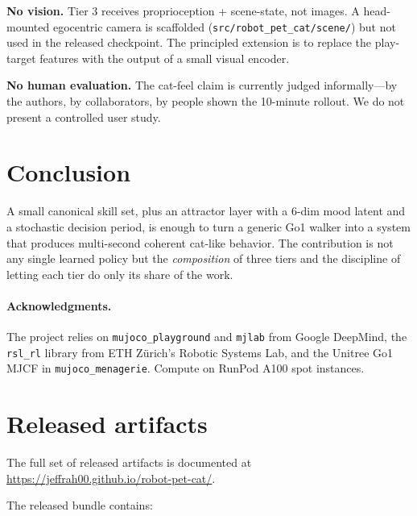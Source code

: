\documentclass[11pt]{article}
\begin{document}
\textbf{No vision.} Tier 3 receives proprioception + scene-state, not
images. A head-mounted egocentric camera is scaffolded
(\texttt{src/robot\_pet\_cat/scene/}) but not used in the released
checkpoint. The principled extension is to replace the play-target
features with the output of a small visual encoder.

\textbf{No human evaluation.} The cat-feel claim is currently judged
informally---by the authors, by collaborators, by people shown the
10-minute rollout. We do not present a controlled user study.

\section{Conclusion}

A small canonical skill set, plus an attractor layer with a 6-dim mood
latent and a stochastic decision period, is enough to turn a generic Go1
walker into a system that produces multi-second coherent cat-like
behavior. The contribution is not any single learned policy but the
\emph{composition} of three tiers and the discipline of letting each tier
do only its share of the work.

\paragraph{Acknowledgments.}
The project relies on \texttt{mujoco\_playground} and \texttt{mjlab} from
Google DeepMind, the \texttt{rsl\_rl} library from ETH Z\"{u}rich's Robotic
Systems Lab, and the Unitree Go1 MJCF in \texttt{mujoco\_menagerie}.
Compute on RunPod A100 spot instances.




\appendix
\section{Released artifacts}

\begin{sloppypar}
The full set of released artifacts is documented at
\url{https://jeffrah00.github.io/robot-pet-cat/}.
\end{sloppypar}
The released bundle contains:
\end{document}
